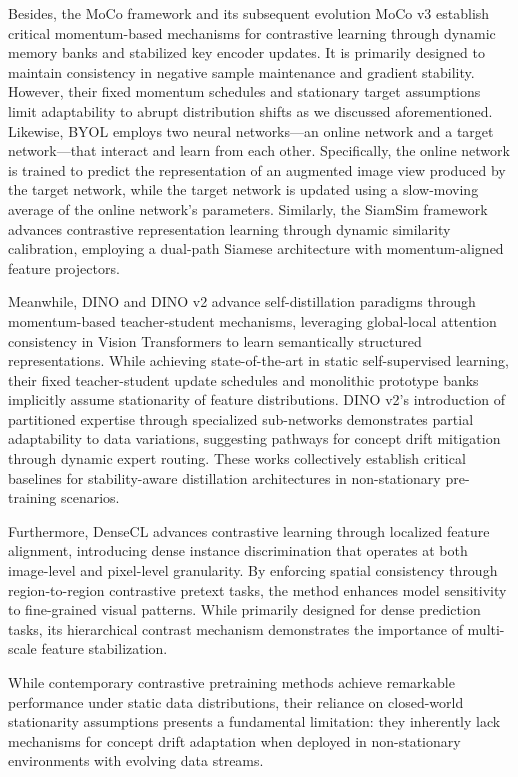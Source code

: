 Besides, the MoCo framework \cite{heMomentumContrastUnsupervised2020} and its subsequent evolution MoCo v3 \cite{chenEmpiricalStudyTraining2021} establish critical momentum-based mechanisms for contrastive learning through dynamic memory banks and stabilized key encoder updates. It is primarily designed to maintain consistency in negative sample maintenance and gradient stability. However, their fixed momentum schedules and stationary target assumptions limit adaptability to abrupt distribution shifts as we discussed aforementioned. Likewise, BYOL \cite{grillBootstrapYourOwn2020} employs two neural networks—an online network and a target network—that interact and learn from each other. Specifically, the online network is trained to predict the representation of an augmented image view produced by the target network, while the target network is updated using a slow-moving average of the online network's parameters. Similarly, the SiamSim framework \cite{chenExploringSimpleSiamese2021} advances contrastive representation learning through dynamic similarity calibration, employing a dual-path Siamese architecture with momentum-aligned feature projectors. 

Meanwhile, DINO \cite{caronEmergingPropertiesSelfSupervised2021} and DINO v2 \cite{zhouDINOWMWorldModels2024} advance self-distillation paradigms through momentum-based teacher-student mechanisms, leveraging global-local attention consistency in Vision Transformers to learn semantically structured representations. While achieving state-of-the-art in static self-supervised learning, their fixed teacher-student update schedules and monolithic prototype banks implicitly assume stationarity of feature distributions. DINO v2's introduction of partitioned expertise through specialized sub-networks demonstrates partial adaptability to data variations, suggesting pathways for concept drift mitigation through dynamic expert routing. These works collectively establish critical baselines for stability-aware distillation architectures in non-stationary pre-training scenarios.

Furthermore, DenseCL \cite{wangDenseContrastiveLearning2021a}  advances contrastive learning through localized feature alignment, introducing dense instance discrimination that operates at both image-level and pixel-level granularity. By enforcing spatial consistency through region-to-region contrastive pretext tasks, the method enhances model sensitivity to fine-grained visual patterns. While primarily designed for dense prediction tasks, its hierarchical contrast mechanism demonstrates the importance of multi-scale feature stabilization.

While contemporary contrastive pretraining methods achieve remarkable performance under static data distributions, their reliance on closed-world stationarity assumptions presents a fundamental limitation: they inherently lack mechanisms for concept drift adaptation when deployed in non-stationary environments with evolving data streams.